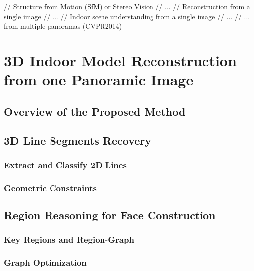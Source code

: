 \documentclass[runningheads]{llncs}
\begin{document}
// Structure from Motion (SfM) or Stereo Vision
// ...
// Reconstruction from a single image
// ...
// Indoor scene understanding from a single image
// ...
// ... from multiple panoramas (CVPR2014)

\section{3D Indoor Model Reconstruction from one Panoramic Image}

\subsection{Overview of the Proposed Method}



\subsection{3D Line Segments Recovery}

\subsubsection {Extract and Classify 2D Lines}

\subsubsection {Geometric Constraints}


\subsection{Region Reasoning for Face Construction}

\subsubsection {Key Regions and Region-Graph} %

\subsubsection {Graph Optimization}

\end{document}
